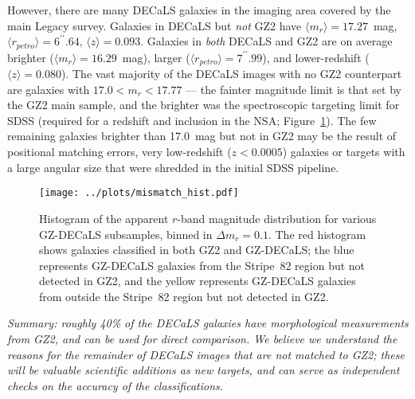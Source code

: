 \documentclass[iop,apj,tighten]{emulateapj}
\begin{document}
However, there are many DECaLS galaxies in the imaging area covered by the main Legacy survey. Galaxies in DECaLS but \emph{not} GZ2 have $\langle m_r\rangle = 17.27$~mag, $\langle r_{petro}\rangle = 6^{\prime\prime}.64$, $\langle z\rangle = 0.093$. Galaxies in \emph{both} DECaLS and GZ2 are on average brighter ($\langle m_r\rangle = 16.29$~mag), larger ($\langle r_{petro}\rangle = 7^{\prime\prime}.99$), and lower-redshift ($\langle z\rangle = 0.080$). The vast majority of the DECaLS images with no GZ2 counterpart are galaxies with $17.0 < m_r < 17.77$ --- the fainter magnitude limit is that set by the GZ2 main sample, and the brighter was the spectroscopic targeting limit for SDSS (required for a redshift and inclusion in the NSA; Figure~\ref{fig:mismatch_hist}). The few remaining galaxies brighter than 17.0~mag but not in GZ2 may be the result of positional matching errors, very low-redshift ($z<0.0005$) galaxies or targets with a large angular size that were shredded in the initial SDSS pipeline. 

\begin{figure}
\centering
\texttt{[image: ../plots/mismatch\_hist.pdf]}
\caption{Histogram of the apparent $r$-band magnitude distribution for various GZ-DECaLS subsamples, binned in $\Delta m_r=0.1$. The red histogram shows galaxies classified in both GZ2 and GZ-DECaLS; the blue represents GZ-DECaLS galaxies from the Stripe~82 region but not detected in GZ2, and the yellow represents GZ-DECaLS galaxies from outside the Stripe~82 region but not detected in GZ2.\label{fig:mismatch_hist}}
\end{figure}

\emph{Summary: roughly 40\% of the DECaLS galaxies have morphological measurements from GZ2, and can be used for direct comparison. We believe we understand the reasons for the remainder of DECaLS images that are not matched to GZ2; these will be valuable scientific additions as new targets, and can serve as independent checks on the accuracy of the classifications.}
\end{document}
